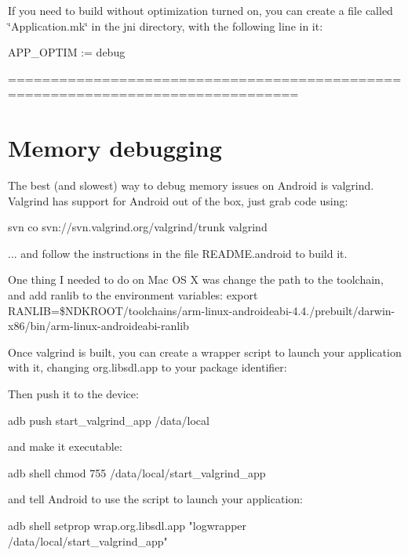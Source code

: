 If you need to build without optimization turned on, you can create a file called \char`\"{}\+Application.\+mk\char`\"{} in the jni directory, with the following line in it\+: \begin{DoxyVerb}APP_OPTIM := debug
\end{DoxyVerb}


================================================================================ \section*{Memory debugging }

The best (and slowest) way to debug memory issues on Android is valgrind. Valgrind has support for Android out of the box, just grab code using\+: \begin{DoxyVerb}svn co svn://svn.valgrind.org/valgrind/trunk valgrind
\end{DoxyVerb}


... and follow the instructions in the file R\+E\+A\+D\+M\+E.\+android to build it.

One thing I needed to do on Mac OS X was change the path to the toolchain, and add ranlib to the environment variables\+: export R\+A\+N\+L\+IB=\$\+N\+D\+K\+R\+O\+OT/toolchains/arm-\/linux-\/androideabi-\/4.4./prebuilt/darwin-\/x86/bin/arm-\/linux-\/androideabi-\/ranlib

Once valgrind is built, you can create a wrapper script to launch your application with it, changing org.\+libsdl.\+app to your package identifier\+: 


Then push it to the device\+: \begin{DoxyVerb}adb push start_valgrind_app /data/local
\end{DoxyVerb}


and make it executable\+: \begin{DoxyVerb}adb shell chmod 755 /data/local/start_valgrind_app
\end{DoxyVerb}


and tell Android to use the script to launch your application\+: \begin{DoxyVerb}adb shell setprop wrap.org.libsdl.app "logwrapper /data/local/start_valgrind_app"
\end{DoxyVerb}


